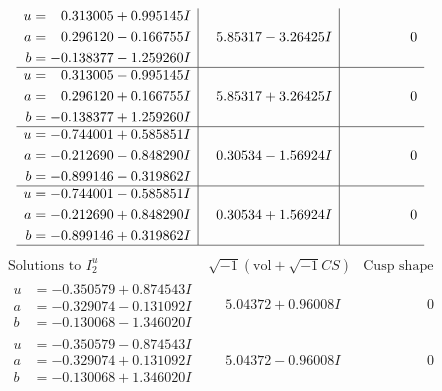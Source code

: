 \documentclass[1p]{elsarticle_modified}
\theoremstyle{definition}
\newcommand{\I}{\sqrt{-1}}
\begin{document}
$$\begin{array}{c|c|c}
\begin{aligned}
u &= \phantom{-}0.313005 + 0.995145 I \\
a &= \phantom{-}0.296120 - 0.166755 I \\
b &= -0.138377 - 1.259260 I\end{aligned}
 & \phantom{-}5.85317 - 3.26425 I & \phantom{-0.000000 } 0 \\ \hline\begin{aligned}
u &= \phantom{-}0.313005 - 0.995145 I \\
a &= \phantom{-}0.296120 + 0.166755 I \\
b &= -0.138377 + 1.259260 I\end{aligned}
 & \phantom{-}5.85317 + 3.26425 I & \phantom{-0.000000 } 0 \\ \hline\begin{aligned}
u &= -0.744001 + 0.585851 I \\
a &= -0.212690 - 0.848290 I \\
b &= -0.899146 - 0.319862 I\end{aligned}
 & \phantom{-}0.30534 - 1.56924 I & \phantom{-0.000000 } 0 \\ \hline\begin{aligned}
u &= -0.744001 - 0.585851 I \\
a &= -0.212690 + 0.848290 I \\
b &= -0.899146 + 0.319862 I\end{aligned}
 & \phantom{-}0.30534 + 1.56924 I & \phantom{-0.000000 } 0\\
 \hline 
 \end{array}$$\newpage$$\begin{array}{c|c|c}  
\text{Solutions to }I^u_{2}& \I (\text{vol} + \sqrt{-1}CS) & \text{Cusp shape}\\
 \hline 
\begin{aligned}
u &= -0.350579 + 0.874543 I \\
a &= -0.329074 - 0.131092 I \\
b &= -0.130068 - 1.346020 I\end{aligned}
 & \phantom{-}5.04372 + 0.96008 I & \phantom{-0.000000 } 0 \\ \hline\begin{aligned}
u &= -0.350579 - 0.874543 I \\
a &= -0.329074 + 0.131092 I \\
b &= -0.130068 + 1.346020 I\end{aligned}
 & \phantom{-}5.04372 - 0.96008 I & \phantom{-0.000000 } 0 \\ \hline\begin{aligned}

\end{aligned}
\end{array}$$
\end{document}
